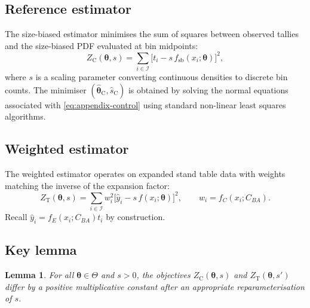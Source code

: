 \documentclass[12pt,letterpaper,leqno]{article}
\theoremstyle{plain}
\newtheorem{lemma}{Lemma}
\begin{document}
\subsection*{Reference estimator}

The size-biased estimator minimises the sum of squares between observed tallies
and the size-biased PDF evaluated at bin midpoints:
\begin{equation}
  Z_{\mathrm{C}}(\boldsymbol{\theta}, s)
  =
  \sum_{i \in \mathcal{I}}
  \Big[t_i - s\, f_{\mathrm{sb}}(x_i; \boldsymbol{\theta})\Big]^2,
  \label{eq:appendix-control}
\end{equation}
where $s$ is a scaling parameter converting continuous densities to discrete
bin counts. The minimiser $(\hat{\boldsymbol{\theta}}_{\mathrm{C}},\hat{s}_{\mathrm{C}})$ is
obtained by solving the normal equations associated with
\eqref{eq:appendix-control} using standard non-linear least squares algorithms.

\subsection*{Weighted estimator}

The weighted estimator operates on expanded stand table data with weights
matching the inverse of the expansion factor:
\begin{equation}
  Z_{\mathrm{T}}(\boldsymbol{\theta}, s)
  =
  \sum_{i \in \mathcal{I}}
  w_i^2
  \Big[\hat{y}_i - s\, f(x_i; \boldsymbol{\theta})\Big]^2,
  \qquad
  w_i = f_C(x_i; C_{BA}).
  \label{eq:appendix-test}
\end{equation}
Recall $\hat{y}_i = f_E(x_i; C_{BA}) t_i$ by construction.

\subsection*{Key lemma}

\begin{lemma}
For all $\boldsymbol{\theta}\in\Theta$ and $s>0$, the objectives
$Z_{\mathrm{C}}(\boldsymbol{\theta}, s)$ and $Z_{\mathrm{T}}(\boldsymbol{\theta}, s')$ differ
by a positive multiplicative constant after an appropriate reparameterisation of
$s$.
\end{lemma}
\end{document}
